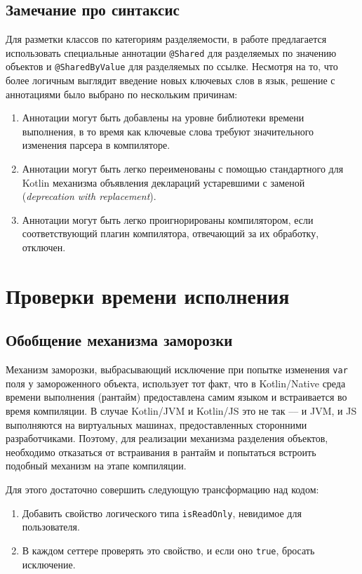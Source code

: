 \documentclass[specification,annotation,times]{itmo-student-thesis}
\begin{document}
\subsection{Замечание про синтаксис}\label{syntax_note}

Для разметки классов по категориям разделяемости, в работе предлагается использовать специальные аннотации \texttt{@Shared} для разделяемых по значению объектов и \texttt{@SharedByValue} для разделяемых по ссылке.
Несмотря на то, что более логичным выглядит введение новых ключевых слов в язык, решение с аннотациями было выбрано по нескольким причинам:

\begin{enumerate}
	\item Аннотации могут быть добавлены на уровне библиотеки времени выполнения, в то время как ключевые слова требуют значительного изменения парсера в компиляторе.
	\item Аннотации могут быть легко переименованы с помощью стандартного для Kotlin механизма объявления деклараций устаревшими с заменой (\textit{deprecation with replacement}).
	\item Аннотации могут быть легко проигнорированы компилятором, если соответствующий плагин компилятора, отвечающий за их обработку, отключен.
\end{enumerate}

\section{Проверки времени исполнения}

\subsection{Обобщение механизма заморозки}

Механизм заморозки, выбрасывающий исключение при попытке изменения \texttt{var} поля у замороженного объекта, использует тот факт, что в Kotlin/Native среда времени выполнения (рантайм) предоставлена самим языком и встраивается во время компиляции.
В случае Kotlin/JVM и Kotlin/JS это не так –-- и JVM, и JS выполняются на виртуальных машинах, предоставленных сторонними разработчиками.
Поэтому, для реализации механизма разделения объектов, необходимо отказаться от встраивания в рантайм и попытаться встроить подобный механизм на этапе компиляции.

Для этого достаточно совершить следующую трансформацию над кодом: 

\begin{enumerate}
	\item Добавить свойство логического типа \texttt{isReadOnly}, невидимое для пользователя.
	\item В каждом сеттере проверять это свойство, и если оно \texttt{true}, бросать исключение.
\end{enumerate}
\end{document}
